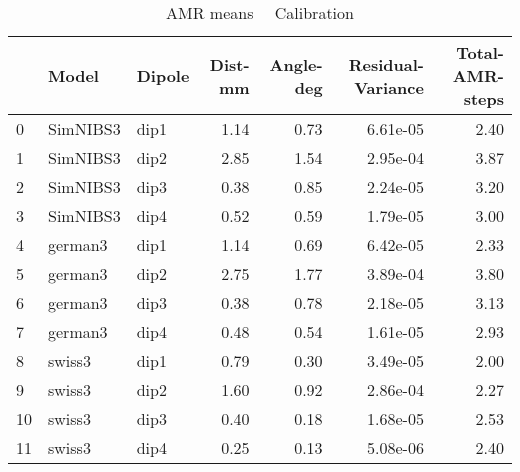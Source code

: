 \documentclass{article}
\begin{document}
\begin{table}
\begin{tabular}{lllrrrr}
\toprule
& Model& Dipole& Dist-mm& Angle-deg& Residual-Variance& Total-AMR-steps\\
\midrule
\rowcolor{lightgray}0 & SimNIBS3 & dip1 & 1.14 & 0.73 & 6.61e-05 & 2.40\\
\rowcolor{lightgray}1 & SimNIBS3 & dip2 & 2.85 & 1.54 & 2.95e-04 & 3.87\\
\rowcolor{lightgray}2 & SimNIBS3 & dip3 & 0.38 & 0.85 & 2.24e-05 & 3.20\\
\rowcolor{lightgray}3 & SimNIBS3 & dip4 & 0.52 & 0.59 & 1.79e-05 & 3.00\\
\rowcolor{yellow}4 & german3 & dip1 & 1.14 & 0.69 & 6.42e-05 & 2.33\\
\rowcolor{yellow}5 & german3 & dip2 & 2.75 & 1.77 & 3.89e-04 & 3.80\\
\rowcolor{yellow}6 & german3 & dip3 & 0.38 & 0.78 & 2.18e-05 & 3.13\\
\rowcolor{yellow}7 & german3 & dip4 & 0.48 & 0.54 & 1.61e-05 & 2.93\\
\rowcolor{pink}8 & swiss3 & dip1 & 0.79 & 0.30 & 3.49e-05 & 2.00\\
\rowcolor{pink}9 & swiss3 & dip2 & 1.60 & 0.92 & 2.86e-04 & 2.27\\
\rowcolor{pink}10 & swiss3 & dip3 & 0.40 & 0.18 & 1.68e-05 & 2.53\\
\rowcolor{pink}11 & swiss3 & dip4 & 0.25 & 0.13 & 5.08e-06 & 2.40\\
\end{tabular}
\caption{AMR means \ \textemdash \ Calibration}
\end{table}
\end{document}
